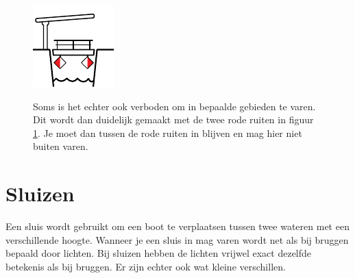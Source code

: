 \begin{figure}[H]
\centering
\begin{minipage}[b]{0.18\textwidth}
	\includegraphics[width=\textwidth]{Hoofdstukken/Bruggen/pdf/brug_verboden_gebied.pdf}
	\caption{}
	\label{pic:brug:gebied_verbod}
\end{minipage}
\hfill
\begin{minipage}[t]{0.75\textwidth}
	\vspace{-2.5cm}
	Soms is het echter ook verboden om in bepaalde gebieden te varen. Dit wordt dan duidelijk gemaakt met de twee rode ruiten in figuur \ref{pic:brug:gebied_verbod}. Je moet dan tussen de rode ruiten in blijven en mag hier niet buiten varen.
\end{minipage}
\end{figure}

\section{Sluizen}
Een sluis wordt gebruikt om een boot te verplaatsen tussen twee wateren met een verschillende hoogte. Wanneer je een sluis in mag varen wordt net als bij bruggen bepaald door lichten.
Bij sluizen hebben de lichten vrijwel exact dezelfde betekenis als bij bruggen. Er zijn echter ook wat kleine verschillen. 

